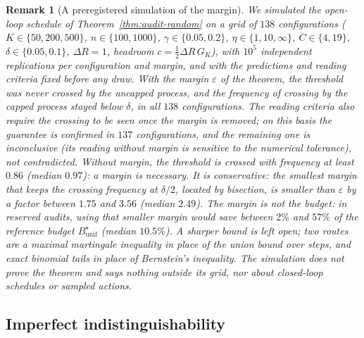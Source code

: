 \documentclass[11pt,a4paper]{article}
\newtheorem{remark}[theorem]{Remark}
\begin{document}
\begin{remark}[A preregistered simulation of the margin]\label{rem:audit-random-sim}
We simulated the open-loop schedule of Theorem~\ref{thm:audit-random} on a grid of $138$ configurations ($K\in\{50,200,500\}$, $n\in\{100,1000\}$, $\gamma\in\{0.05,0.2\}$, $\eta\in\{1,10,\infty\}$, $C\in\{4,19\}$, $\delta\in\{0.05,0.1\}$, $\Delta R=1$, headroom $c=\tfrac12\Delta R\,G_K$), with $10^5$ independent replications per configuration and margin, and with the predictions and reading criteria fixed before any draw. With the margin $\varepsilon$ of the theorem, the threshold was never crossed by the uncapped process, and the frequency of crossing by the capped process stayed below $\delta$, in all $138$ configurations. The reading criteria also require the crossing to be seen once the margin is removed; on this basis the guarantee is confirmed in $137$ configurations, and the remaining one is inconclusive (its reading without margin is sensitive to the numerical tolerance), not contradicted. Without margin, the threshold is crossed with frequency at least $0.86$ (median $0.97$): a margin is necessary. It is conservative: the smallest margin that keeps the crossing frequency at $\delta/2$, located by bisection, is smaller than $\varepsilon$ by a factor between $1.75$ and $3.56$ (median $2.49$). The margin is not the budget: in reserved audits, using that smaller margin would save between $2\%$ and $57\%$ of the reference budget $B^\star_{\mathrm{unif}}$ (median $10.5\%$). A sharper bound is left open; two routes are a maximal martingale inequality in place of the union bound over steps, and exact binomial tails in place of Bernstein's inequality. The simulation does not prove the theorem and says nothing outside its grid, nor about closed-loop schedules or sampled actions.
\end{remark}

\subsection{Imperfect indistinguishability}
\end{document}
